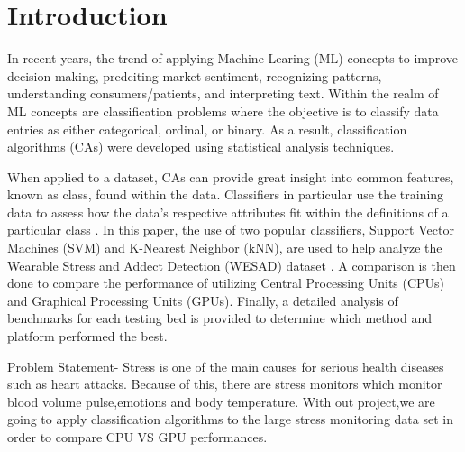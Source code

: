 \section{Introduction}
\label{sec:Introduction}

In recent years, the trend of applying Machine Learing (ML) concepts to improve decision making, predciting 
market sentiment, recognizing patterns, understanding consumers/patients, and interpreting text. 
Within the realm of ML concepts are classification problems where the objective is to classify data entries 
as either categorical, ordinal, or binary. 
As a result, classification algorithms (CAs) were developed using statistical analysis techniques. 

When applied to a dataset, CAs can provide great insight into common features, known as class,
found within the data. Classifiers in particular use the training data to assess how the data's respective 
attributes fit within the definitions of a particular class \cite{class}. In this paper, the use of two 
popular classifiers, Support Vector Machines (SVM) and K-Nearest Neighbor (kNN), are used to help 
analyze the Wearable Stress and Addect Detection (WESAD) dataset \cite{dataset}. A comparison is then done 
to compare the performance of utilizing Central Processing Units (CPUs) and Graphical Processing Units (GPUs).
Finally, a detailed analysis of benchmarks for each testing bed is provided to determine which method and 
platform performed the best.  


Problem Statement- Stress is one of the main causes for serious health diseases such as heart attacks. Because of this, there are stress monitors which monitor blood volume pulse,emotions and body temperature. With out project,we are going to apply classification algorithms to the large stress monitoring data set in order to compare CPU VS GPU performances. 
